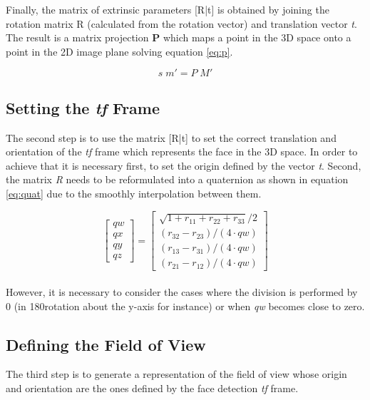 \documentclass{sig-alternate}
\begin{document}
Finally, the matrix of extrinsic parameters [R|t] is obtained by joining the rotation matrix R (calculated from the rotation vector) and translation vector \textit{t}. The result is a matrix projection \textbf{P} which maps a point in the 3D space onto a point in the 2D image plane solving equation \ref{eq:p}.

\begin{equation}
s  \; m' = P \; M'
\label{eq:p}
\end{equation}

\subsection{Setting the \textit{tf} Frame}
The second step is to use the matrix [R|t] to set the correct translation and orientation of the \textit{tf} frame which represents the face in the 3D space. In order to achieve that it is necessary first, to set the origin defined by the vector \textit{t}. Second, the matrix \textit{R} needs to be reformulated into a quaternion as shown in equation \ref{eq:quat} due to the smoothly interpolation between them.

\begin{equation}
\begin{bmatrix}
qw \\
qx \\
qy \\
qz
\end{bmatrix}
=
\begin{bmatrix}
\sqrt{1 + r_{11} + r_{22} + r_{33}} /2 \\
(r_{32} - r_{23})/( 4 \cdot qw) \\
(r_{13} - r_{31})/( 4 \cdot qw) \\
(r_{21} - r_{12})/( 4 \cdot qw)
\end{bmatrix}
\label{eq:quat}
\end{equation}
\\
However, it is necessary to consider the cases where the division is performed by 0 (in 180\degree rotation about the y-axis for instance) or when \textit{qw} becomes close to zero.

\subsection{Defining the Field of View}
The third step is to generate a representation of the field of view whose origin and orientation are the ones defined by the face detection \textit{tf} frame. 
\end{document}
